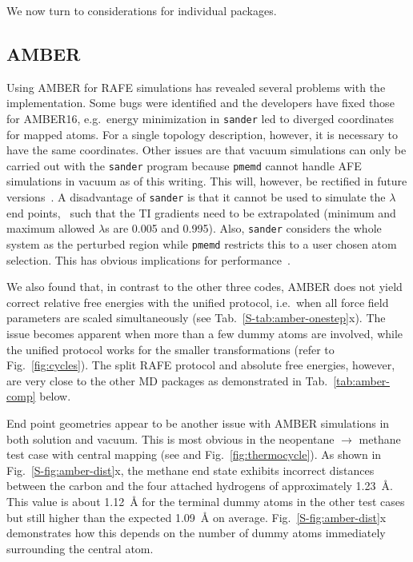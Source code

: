 \documentclass[journal=jctcce,manuscript=article]{achemso}
\newcommand{\progname}[1]{\texttt{#1}}
\begin{document}
We now turn to considerations for individual packages. 

\subsection{AMBER}
\label{sec:amber-results}

Using AMBER for RAFE simulations has revealed several problems with the implementation.  Some bugs were identified and the developers have fixed those for AMBER16, e.g.\ energy minimization in \progname{sander} led to
diverged coordinates for mapped atoms.  For a single topology description,
however, it is necessary to have the same coordinates.  Other issues are that
vacuum simulations can only be carried out with the \progname{sander} program
because \progname{pmemd} cannot handle AFE simulations in vacuum as of this writing.  This will, however, be rectified in future
versions~\cite{doi:10.1021/acs.jctc.7b00102}.  A disadvantage of
\progname{sander} is that it cannot be used to simulate the $\lambda$ end
points,~\cite{doi:10.1021/ct400340s} such that the TI gradients need to be
extrapolated (minimum and maximum allowed $\lambda$s are 0.005 and 0.995).
Also, \progname{sander} considers the whole system as the perturbed
region while \progname{pmemd} restricts this to a user chosen atom selection.
This has obvious implications for performance~\cite{doi:10.1021/ct400340s}.

We also found that, in contrast to the other three codes, AMBER does not yield
correct relative free energies with the unified protocol, i.e.\
when all force field parameters are scaled simultaneously (see
Tab.~\ref{S-tab:amber-onestep}x). The issue becomes apparent when more than a few dummy atoms are involved, while the unified protocol works for the
smaller transformations (refer to Fig.~\ref{fig:cycles}).  The split RAFE
protocol and absolute free energies, however, are very close to the other MD
packages as demonstrated in Tab.~\ref{tab:amber-comp} below.

End point geometries appear to be another issue with AMBER simulations
in both solution and vacuum.  This is most obvious in the neopentane
$\rightarrow$ methane test case with central mapping (see
 and Fig.~\ref{fig:thermocycle}).
As shown in Fig.~\ref{S-fig:amber-dist}x, the methane end state exhibits
incorrect distances between the carbon and the four
attached hydrogens of approximately \SI{1.23}{\angstrom}.  This value is about
\SI{1.12}{\angstrom} for the terminal dummy atoms in the other test cases but
still higher than the expected \SI{1.09}{\angstrom} on average.
Fig.~\ref{S-fig:amber-dist}x demonstrates how this depends on the number of
dummy atoms immediately surrounding the central atom.
\end{document}
